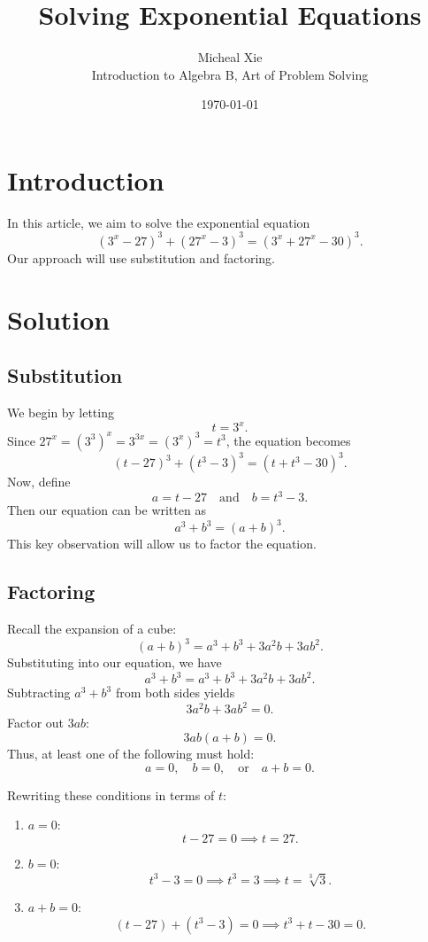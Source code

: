 \documentclass{article}
\title{Solving Exponential Equations}
\author{Micheal Xie \\ Introduction to Algebra B, Art of Problem Solving}
\date{\today}
\begin{document}
\maketitle

\section{Introduction}

In this article, we aim to solve the exponential equation
\[
(3^x - 27)^3 + (27^x - 3)^3 = (3^x + 27^x - 30)^3.
\]
Our approach will use substitution and factoring.

\section{Solution}

\subsection{Substitution}

We begin by letting 
\[
t = 3^x.
\]
Since \(27^x = (3^3)^x = 3^{3x} = (3^x)^3 = t^3\), the equation becomes
\[
(t - 27)^3 + (t^3 - 3)^3 = (t + t^3 - 30)^3.
\]
Now, define
\[
a = t - 27 \quad \text{and} \quad b = t^3 - 3.
\]
Then our equation can be written as
\[
a^3 + b^3 = (a+b)^3.
\]
This key observation will allow us to factor the equation.

\subsection{Factoring}

Recall the expansion of a cube:
\[
(a+b)^3 = a^3 + b^3 + 3a^2b + 3ab^2.
\]
Substituting into our equation, we have
\[
a^3 + b^3 = a^3 + b^3 + 3a^2b + 3ab^2.
\]
Subtracting \(a^3+b^3\) from both sides yields
\[
3a^2b + 3ab^2 = 0.
\]
Factor out \(3ab\):
\[
3ab(a+b) = 0.
\]
Thus, at least one of the following must hold:
\[
a = 0,\quad b = 0, \quad \text{or} \quad a+b = 0.
\]

Rewriting these conditions in terms of \(t\):

\begin{enumerate}
    \item \(a = 0\): 
    \[
    t - 27 = 0 \implies t = 27.
    \]
    \item \(b = 0\): 
    \[
    t^3 - 3 = 0 \implies t^3 = 3 \implies t = \sqrt[3]{3}.
    \]
    \item \(a+b = 0\): 
    \[
    (t - 27) + (t^3 - 3) = 0 \implies t^3 + t - 30 = 0.
    \]
\end{enumerate}
\end{document}
